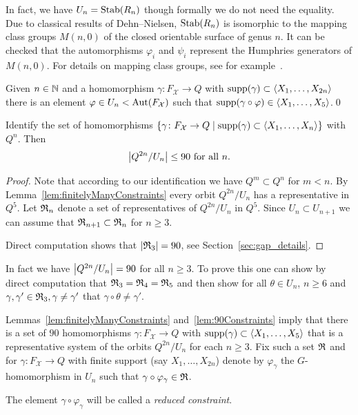 \documentclass[a4paper,11pt]{amsart}
\begin{document}
\begin{re}
  In fact, we have $U_n = \operatorname{Stab}(R_n)$ though formally we do not need
  the equality.  Due to classical results of Dehn--Nielsen,
  $\operatorname{Stab}(R_n)$ is isomorphic to the mapping class groups $M(n,0)$ of
  the closed orientable surface of genus $n$. It can be checked that
  the automorphisms $\varphi_i$ and $\psi_i$ represent the Humphries
  generators of $M(n,0)$.  For details on mapping class groups, see
  for example~\cite{Farb-Margalit:MCG}.
\end{re}

\begin{lem}\label{lem:finitelyManyConstraints}
 Given $n\in \mathbb{N}$ and a homomorphism $\gamma\colon F_{\mathcal{X}} \to Q$ with $\operatorname{{supp}}(\gamma) \subset \left<X_1,\ldots ,X_{2n}\right>$
 there is an element $\varphi \in U_n<\operatorname{{Aut}}(F_{\mathcal{X}})$ such that $\operatorname{{supp}}(\gamma\circ\varphi) \in \left<X_1,\dotsc,X_5\right>$.\qed
\end{lem}
\begin{lem}\label{lem:90Constraints}
 Identify the set of homomorphisms $\{\gamma \colon F_{\mathcal{X}} \to Q \mid \operatorname{{supp}}(\gamma) \subset \left<X_1,\ldots, X_n\right>\}$ with $Q^{n}$. 
 Then 
 \[\left|{Q^{2n}/U_n}\right|\leq 90 \text{ for all } n.\]
\end{lem}
\begin{proof}
Note that according to our identification we have $Q^m \subset Q^n$ for $m < n$.
By Lemma~\ref{lem:finitelyManyConstraints} every orbit $Q^{2n} / U_n$ has a representative in $Q^5$.
Let $\mathfrak{R}_n$ denote a set of representatives of $Q^{2n}/ U_n$ in $Q^5$. 
Since $U_n \subset U_{n+1}$ we can assume that $\mathfrak{R}_{n+1} \subset \mathfrak{R}_n$ for $n \ge 3$.


Direct computation shows that $|\mathfrak{R}_3| = 90$,
see Section~\ref{sec:gap_details}.
\end{proof}
\begin{re}
 In fact we have $\left|{Q^{2n}/U_n}\right|= 90$ for all $n\geq3$.
  To prove this one can show by direct computation that
   $\mathfrak{R}_3=\mathfrak{R}_4=\mathfrak{R}_5$ and then show for all $\theta\in U_n$,
    $n\geq6$ and $\gamma,\gamma'\in\mathfrak{R}_3,\gamma\neq\gamma'$
 that $\gamma\circ \theta\neq\gamma'$.
\end{re}

\begin{nota}
  Lemmas~\ref{lem:finitelyManyConstraints} and~\ref{lem:90Constraints}
  imply that there is a set of $90$ homomorphisms
  $\gamma\colon F_{\mathcal{X}} \to Q$ with
  $\operatorname{{supp}}(\gamma) \subset \left<X_1,\ldots, X_5\right>$ that is a
  representative system of the orbits $Q^{2n} / U_n$ for each
  $n \ge 3$.  Fix such a set $\mathfrak{R}$ and for
  $\gamma \colon F_{\mathcal{X}} \to Q$ with finite support (say
  $X_1,\dots,X_{2n}$) denote by $\varphi_\gamma$ the $G$-homomorphism
  in $U_n$ such that $\gamma\circ \varphi_\gamma \in \mathfrak{R}$.
 
  The element $\gamma \circ \varphi_\gamma$ will be called a
  \emph{reduced constraint}.
\end{nota}
\end{document}
